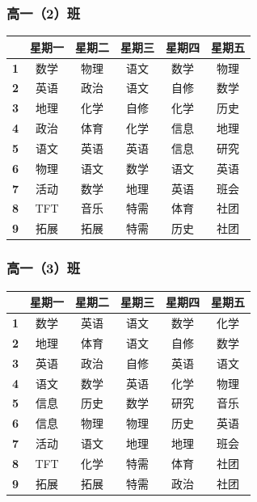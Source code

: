 \documentclass[a4paper]{article}
\begin{document}
  \subsubsection{高一（2）班}

   \begin{tabular}{cccccc}
   \toprule
   & \bf 星期一 & \bf 星期二 & \bf 星期三 & \bf 星期四 & \bf 星期五 \\
   \midrule
   \bf 1 & 数学 & 物理 & 语文 & 数学 & 物理 \\
   \bf 2 & 英语 & 政治 & 语文 & 自修 & 数学 \\
   \bf 3 & 地理 & 化学 & 自修 & 化学 & 历史 \\
   \bf 4 & 政治 & 体育 & 化学 & 信息 & 地理 \\
   \bf 5 & 语文 & 英语 & 英语 & 信息 & 研究 \\
   \midrule
   \bf 6 & 物理 & 语文 & 数学 & 语文 & 英语 \\
   \bf 7 & 活动 & 数学 & 地理 & 英语 & 班会 \\
   \bf 8 & TFT  & 音乐 & 特需 & 体育 & 社团 \\
   \bf 9 & 拓展 & 拓展 & 特需 & 历史 & 社团 \\
   \bottomrule
   \end{tabular}

  \subsubsection{高一（3）班}

   \begin{tabular}{cccccc}
   \toprule
   & \bf 星期一 & \bf 星期二 & \bf 星期三 & \bf 星期四 & \bf 星期五 \\
   \midrule
   \bf 1 & 数学 & 英语 & 语文 & 数学 & 化学 \\
   \bf 2 & 地理 & 体育 & 语文 & 自修 & 数学 \\
   \bf 3 & 英语 & 政治 & 自修 & 英语 & 语文 \\
   \bf 4 & 语文 & 数学 & 英语 & 化学 & 物理 \\
   \bf 5 & 信息 & 历史 & 数学 & 研究 & 音乐 \\
   \midrule
   \bf 6 & 信息 & 物理 & 物理 & 历史 & 英语 \\
   \bf 7 & 活动 & 语文 & 地理 & 地理 & 班会 \\
   \bf 8 & TFT  & 化学 & 特需 & 体育 & 社团 \\
   \bf 9 & 拓展 & 拓展 & 特需 & 政治 & 社团 \\
   \bottomrule
   \end{tabular}
\end{document}
